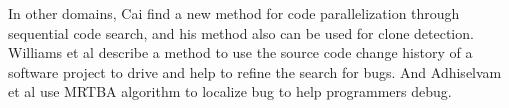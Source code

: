 In other domains, Cai \cite{cai2016code} find a new method for code parallelization through sequential code search, and his method also can be used for clone detection. Williams et al \cite{williams2005automatic} describe a method to use the source code change history of a software project to drive and help to refine the search for bugs. And Adhiselvam et al \cite{adhiselvam2015enhanced} use MRTBA algorithm to localize bug to help programmers debug.






